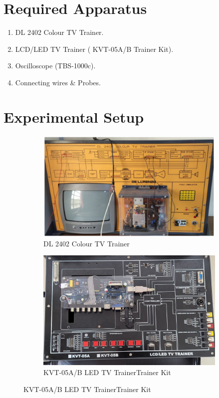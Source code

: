 \documentclass[a4paper,12pt]{article}
\begin{document}
	
	
	\section{Required Apparatus}
	\begin{enumerate}
		
		\item 	DL 2402 Colour TV Trainer.
		\item   LCD/LED TV Trainer ( KVT-05A/B Trainer Kit).
		\item	Oscilloscope (TBS-1000c).
		\item  Connecting wires \& Probes.
	\end{enumerate}
	\section{Experimental Setup}
	\begin{figure}[H]
		\centering
		\begin{subfigure}[t]{0.49\textwidth}
			\centering
			\includegraphics[width=1\linewidth, height=0.205\textheight]{Images/2}
			\caption{DL 2402 Colour TV Trainer}
			\vspace{0.1cm}
		\end{subfigure}
		\hfil
		\begin{subfigure}[t]{0.49\textwidth}
			\centering
			\includegraphics[width=1\linewidth]{Images/1}
			\caption{KVT-05A/B LED TV TrainerTrainer Kit}
		\end{subfigure}
	\end{figure}
	
\end{document}
